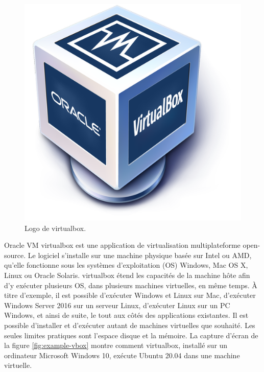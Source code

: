 \documentclass[12pt, french]{report}
\begin{document}
\begin{figure}[H]
\includegraphics[scale=0.2]{assets/img/logo-virtualbox.png}
\centering
\caption{Logo de \gls{virtualbox}.}
\label{fig:logo-adaltas}
\end{figure}

Oracle VM \gls{virtualbox} est une application de virtualisation multiplateforme open-source. Le logiciel s'installe sur une machine physique basée sur Intel ou AMD, qu'elle fonctionne sous les systèmes d'exploitation (OS) Windows, Mac OS X, Linux ou Oracle Solaris. \gls{virtualbox} étend les capacités de la machine hôte afin d'y exécuter plusieurs OS, dans plusieurs machines virtuelles, en même temps. À titre d'exemple, il est possible d'exécuter Windows et Linux sur Mac, d'exécuter Windows Server 2016 sur un serveur Linux, d'exécuter Linux sur un PC Windows, et ainsi de suite, le tout aux côtés des applications existantes. Il est possible d'installer et d'exécuter autant de machines virtuelles que souhaité. Les seules limites pratiques sont l'espace disque et la mémoire. La capture d'écran de la figure \ref{fig:example-vbox} montre comment \gls{virtualbox}, installé sur un ordinateur Microsoft Windows 10, exécute Ubuntu 20.04 dans une machine virtuelle.
\end{document}
